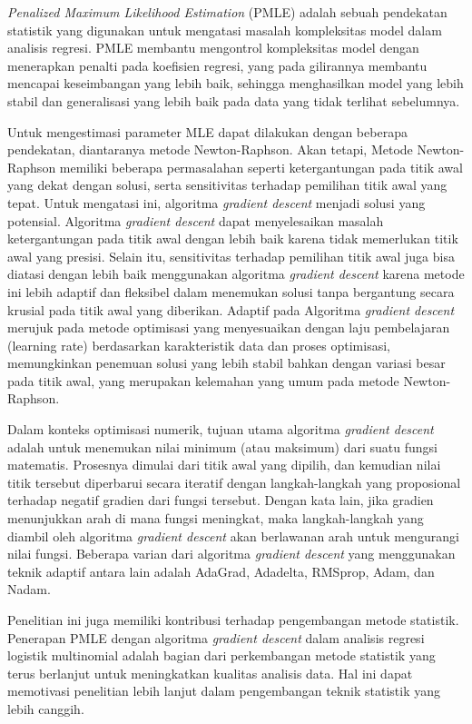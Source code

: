 \textit{Penalized Maximum Likelihood Estimation} (PMLE) adalah sebuah pendekatan statistik yang digunakan untuk mengatasi masalah kompleksitas model dalam analisis regresi. PMLE membantu mengontrol kompleksitas model dengan menerapkan penalti pada koefisien regresi, yang pada gilirannya membantu mencapai keseimbangan yang lebih baik, sehingga menghasilkan model yang lebih stabil dan generalisasi yang lebih baik pada data yang tidak terlihat sebelumnya. \citep*{Lee2020}

Untuk mengestimasi parameter MLE dapat dilakukan dengan beberapa pendekatan, diantaranya metode Newton-Raphson. Akan tetapi, Metode Newton-Raphson memiliki beberapa permasalahan seperti ketergantungan pada titik awal yang dekat dengan solusi, serta sensitivitas terhadap pemilihan titik awal yang tepat. Untuk mengatasi ini, algoritma \textit{gradient descent} menjadi solusi yang potensial. Algoritma \textit{gradient descent} dapat menyelesaikan masalah ketergantungan pada titik awal dengan lebih baik karena tidak memerlukan titik awal yang presisi. Selain itu, sensitivitas terhadap pemilihan titik awal juga bisa diatasi dengan lebih baik menggunakan algoritma \textit{gradient descent} karena metode ini lebih adaptif dan fleksibel dalam menemukan solusi tanpa bergantung secara krusial pada titik awal yang diberikan. Adaptif pada Algoritma \textit{gradient descent} merujuk pada metode optimisasi yang menyesuaikan dengan laju pembelajaran (learning rate) berdasarkan karakteristik data dan proses optimisasi,  memungkinkan penemuan solusi yang lebih stabil bahkan dengan variasi besar pada titik awal, yang merupakan kelemahan yang umum pada metode Newton-Raphson.

Dalam konteks optimisasi numerik, tujuan utama algoritma \textit{gradient descent} adalah untuk menemukan nilai minimum (atau maksimum) dari suatu fungsi matematis. Prosesnya dimulai dari titik awal yang dipilih, dan kemudian nilai titik tersebut diperbarui secara iteratif dengan langkah-langkah yang proposional terhadap negatif gradien dari fungsi tersebut. Dengan kata lain, jika gradien menunjukkan arah di mana fungsi meningkat, maka langkah-langkah yang diambil oleh algoritma \textit{gradient descent} akan berlawanan arah untuk mengurangi nilai fungsi. Beberapa varian dari algoritma \textit{gradient descent} yang menggunakan teknik adaptif antara lain adalah AdaGrad, Adadelta, RMSprop, Adam, dan Nadam.

Penelitian ini juga memiliki kontribusi terhadap pengembangan metode statistik. Penerapan PMLE dengan algoritma \textit{gradient descent} dalam analisis regresi logistik multinomial adalah bagian dari perkembangan metode statistik yang terus berlanjut untuk meningkatkan kualitas analisis data. Hal ini dapat memotivasi penelitian lebih lanjut dalam pengembangan teknik statistik yang lebih canggih.

